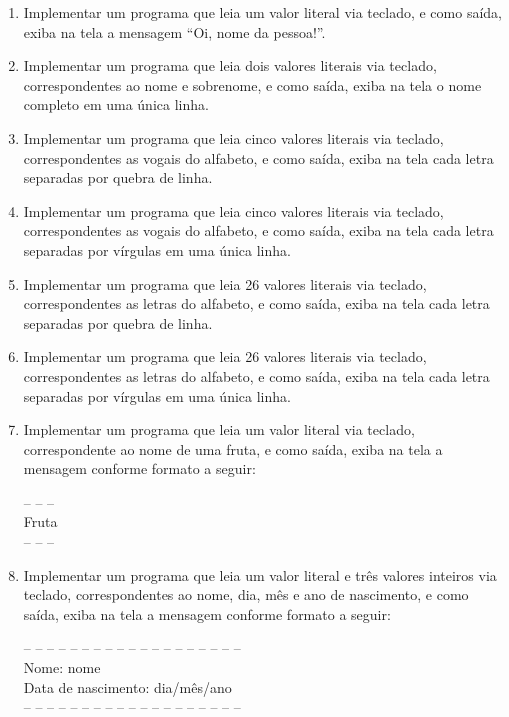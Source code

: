 \documentclass[11pt]{article}
\begin{document}
\begin{enumerate}
	
	\item Implementar um programa que leia um valor literal via teclado, e como saída, exiba na tela a
	mensagem ``Oi, nome da pessoa!''.
	
	\item Implementar um programa que leia dois valores literais via teclado, correspondentes ao nome e
	sobrenome, e como saída, exiba na tela o nome completo em uma única linha.
	
	\item  Implementar um programa que leia cinco valores literais via teclado, correspondentes as vogais
	do alfabeto, e como saída, exiba na tela cada letra separadas por quebra de linha.
	
	\item  Implementar um programa que leia cinco valores literais via teclado, correspondentes as vogais
	do alfabeto, e como saída, exiba na tela cada letra separadas por vírgulas em uma única linha.
	
	\item Implementar um programa que leia 26 valores literais via teclado, correspondentes as letras do
	alfabeto, e como saída, exiba na tela cada letra separadas por quebra de linha.
	
	\item Implementar um programa que leia 26 valores literais via teclado, correspondentes as letras do
	alfabeto, e como saída, exiba na tela cada letra separadas por vírgulas em uma única linha.
	
	\item Implementar um programa que leia um valor literal via teclado, correspondente ao nome de uma
	fruta, e como saída, exiba na tela a mensagem conforme formato a seguir:
	
	-- -- --\\
	Fruta\\
	-- -- --
	
	\item Implementar um programa que leia um valor literal e três valores inteiros via teclado,
	correspondentes ao nome, dia, mês e ano de nascimento, e como saída, exiba na tela a mensagem
	conforme formato a seguir:
	
	-- -- -- -- -- -- -- -- -- -- -- -- -- -- -- -- -- -- --\\
	Nome: nome\\
	Data de nascimento: dia/mês/ano\\
	-- -- -- -- -- -- -- -- -- -- -- -- -- -- -- -- -- -- --
\end{enumerate}
\end{document}
